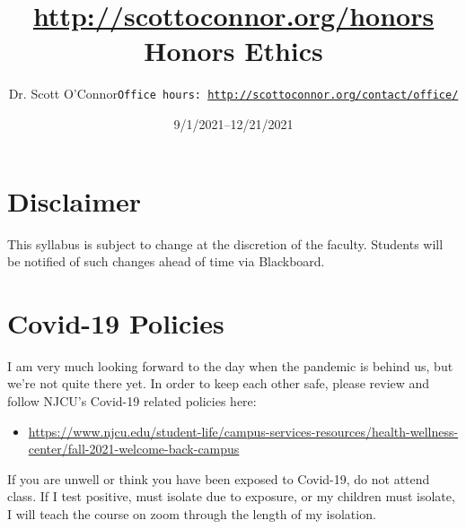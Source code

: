 \documentclass[article,oneside]{memoir}
\def\myauthor{Author}
\def\mytitle{Title}
\def\mycopyright{\myauthor}
\def\myweb{\href{http://scottoconnor.org/honors}{http://scottoconnor.org/honors}}
\def\myauthor{Dr. Scott O'Connor}
\def\mytitle{{\normalsize \myweb \newline} \HUGE Honors Ethics}
\begin{document}
\setsansfont[Mapping=tex-text]{Myriad Pro} 
\setmonofont[Mapping=tex-text,Scale=0.8]{Georgia} 

\def\ind{\hangindent=1 true cm\hangafter=1 \noindent}
\def\labelitemi{$\cdot$}


\title{\LARGE \mytitle}     
\author{\Large\myauthor \newline \footnotesize\texttt{\noindent Office hours: \href{http://scottoconnor.org/contact/office/}{http://scottoconnor.org/contact/office/}}}
\date{9/1/2021--12/21/2021}



\maketitle




%
%


\section{Disclaimer}
 This syllabus is subject to change at the discretion of the faculty. Students will be notified of such changes ahead of time via Blackboard. 

\section{Covid-19 Policies}
I am very much looking forward to the day when the pandemic is behind us, but we’re not quite there yet. In order to keep each other safe, please review and follow NJCU's Covid-19 related policies here:  
\begin{itemize}
\item \href{https://www.njcu.edu/student-life/campus-services-resources/health-wellness-center/fall-2021-welcome-back-campus}{https://www.njcu.edu/student-life/campus-services-resources/health-wellness-center/fall-2021-welcome-back-campus}
\end{itemize}
If you are unwell or think you have been exposed to Covid-19, do not attend class. If I test positive, must isolate due to exposure, or my children must isolate, I will teach the course on zoom through the length of my isolation. 
\end{document}
